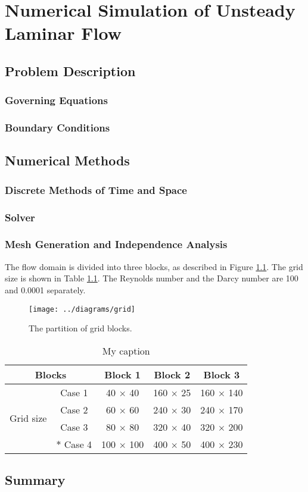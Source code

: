 \chapter{Numerical Simulation of Unsteady Laminar Flow}
\section{Problem Description}
\subsection{Governing Equations} %
\subsection{Boundary Conditions} %


\section{Numerical Methods}
\subsection{Discrete Methods of Time and Space}
\subsection{Solver} %
\subsection{Mesh Generation and Independence Analysis}
The flow domain is divided into three blocks, as described in Figure \ref{fig: grid}. The grid size is shown in Table \ref{tab: grid}.
The Reynolds number and the Darcy number are 100 and 0.0001 separately.
\begin{figure}
	\centering
	\texttt{[image: ../diagrams/grid]}
	\caption{The partition of grid blocks.}\label{fig: grid}
\end{figure}
\begin{table}[h]
	\centering
	\caption{My caption}
	\label{tab: grid}
	\begin{tabular}{@{}ccccc@{}}
		\toprule
		\multicolumn{2}{c}{Blocks}  & Block 1  & Block 2   & Block 3    \\ \midrule
		\multirow{4}{*}{Grid size} 
		& Case 1 & 40 $\times$ 40 & 160 $\times$ 25 & 160 $\times$ 140 \\
		& Case 2 & 60 $\times$ 60 & 240 $\times$ 30 & 240 $\times$ 170 \\
		& Case 3 & 80 $\times$ 80 & 320 $\times$ 40 & 320 $\times$ 200 \\
		&$\ast$ Case 4 & 100 $\times$ 100 & 400 $\times$ 50 & 400 $\times$ 230 \\
		\bottomrule
	\end{tabular}
\end{table}


\section{Summary}
